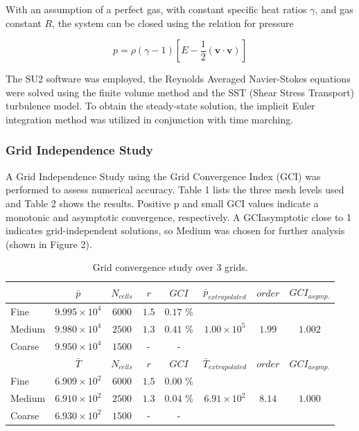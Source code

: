 With an assumption of a perfect gas, with constant specific heat ratios $\gamma$, and gas constant $R$, the system can be closed using the relation for pressure

\begin{equation}
    p = \rho \left( \gamma - 1 \right) \left[ E - \frac{1}{2} \left( \mathbf{v} \cdot \mathbf{v} \right) \right]
    \label{eq:pressure}
\end{equation}

The SU2 software \cite{Economon2016a} was employed, the Reynolds Averaged Navier-Stokes equations were solved using the finite volume method and the SST (Shear Stress Transport) turbulence model. To obtain the steady-state solution, the implicit Euler integration method was utilized in conjunction with time marching.

\subsubsection{Grid Independence Study}

A Grid Independence Study using the Grid Convergence Index (GCI) \cite{Roache1994} was performed to assess numerical accuracy. Table 1 lists the three mesh levels used and Table 2 shows the results. Positive p and small GCI values indicate a monotonic and asymptotic convergence, respectively. A GCIasymptotic close to 1 indicates grid-independent solutions, so Medium was chosen for further analysis (shown in Figure 2).

\begin{table}
\centering
\begin{tabular}{lccccccc}
\toprule
        & $ \bar{p} $ & $ N_{cells} $ & $ r $ & $ GCI $ & $ \bar{p}_{extrapolated} $ & $ order $ &  $ GCI_{asymp.} $ \\ \midrule
Fine    & $9.995\times10^4$ & $6000$  & $1.5$ & $0.17$ \% &  \multirow{3}{*}{$1.00\times10^5$} &  \multirow{3}{*}{$1.99$} &  \multirow{3}{*}{$1.002$} \\ 
Medium  & $9.980\times10^4$ & $2500$  & $1.3$ & $0.41$ \% & & & \\ 
Coarse  & $9.950\times10^4$ & $1500$  & -     & -         & & & \\ 
        & $ \bar{T} $ & $ N_{cells} $ & $ r $ & $ GCI $ & $ \bar{T}_{extrapolated} $ & $ order $ &  $ GCI_{asymp.}$ \\ \midrule 
Fine    & $6.909\times10^2$ & $6000$  & $1.5$ & $0.00$ \% &  \multirow{3}{*}{$6.91\times10^2$}  &   \multirow{3}{*}{$8.14$} &   \multirow{3}{*}{$1.000$} \\ 
Medium  & $6.910\times10^2$ & $2500$  & $1.3$ & $0.04$ \% & & & \\ 
Coarse  & $6.930\times10^2$ & $1500$  & -     & -         & & & \\ 
\bottomrule
\end{tabular}
\caption{Grid convergence study over 3 grids.}
\label{tab:gci_study}
\end{table}

